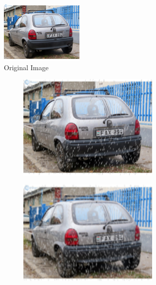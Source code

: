 \begin{figure}
    \begin{subfigure}[b]{\textwidth}
        \centering
        \includegraphics[width=0.45\textwidth]{figures/original.jpg}
        \caption{Original Image}
        \label{fig:weather-original}
    \end{subfigure}
    \begin{subfigure}[b]{\textwidth}
        \begin{subfigure}[b]{.45\textwidth}
            \includegraphics[width=\textwidth]{figures/lightrain.jpg}
        \end{subfigure}
        \hfill
        \begin{subfigure}[b]{.45\textwidth}
            \includegraphics[width=\textwidth]{figures/rain.jpg}

\end{subfigure}
\end{subfigure}
\end{figure}

